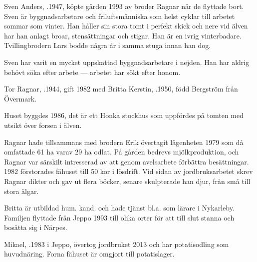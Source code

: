 
%
Sven Anders, .1947, köpte gården 1993 av broder Ragnar när de flyttade bort. Sven är byggnadsarbetare och friluftsmänniska som helst cyklar till arbetet sommar som vinter. Han håller sin stora tomt i perfekt skick och nere vid älven har han anlagt broar, stensättningar och stigar. Han är en ivrig vinterbadare. Tvillingbrodern Lars bodde några år i samma stuga innan han dog.

Sven har varit en mycket uppskattad byggnadsarbetare i nejden. Han har aldrig behövt söka efter arbete --- arbetet har sökt efter honom.



%
Tor Ragnar, .1944, gift 1982 med Britta Kerstin, .1950, född Bergström från Övermark.
\begin{jhchildren}
  \item {}
  \item {}
\end{jhchildren}
Huset byggdes 1986, det är ett Honka stockhus som uppfördes på tomten med utsikt över forsen i älven.

Ragnar hade tillsammans med brodern Erik övertagit lägenheten 1979 som då omfattade 61 ha varav 29 ha odlat. På gården bedrevs mjölkproduktion, och Ragnar var särskilt intresserad av att genom avelsarbete förbättra besättningar. 1982 förstorades fähuset till 50 kor i lösdrift. Vid sidan av jordbruksarbetet skrev Ragnar dikter och gav ut flera böcker, senare skulpterade han djur, från små till stora älgar.

Britta är utbildad hum. kand. och hade tjänst bl.a. som lärare i Nykarleby. Familjen flyttade från Jeppo 1993 till olika orter för att till slut stanna och bosätta sig i Närpes.



%


%
Mikael, .1983 i Jeppo, övertog jordbruket 2013 och har potatisodling som huvudnäring. Forna fähuset är omgjort till potatislager.\jhvspace{}


